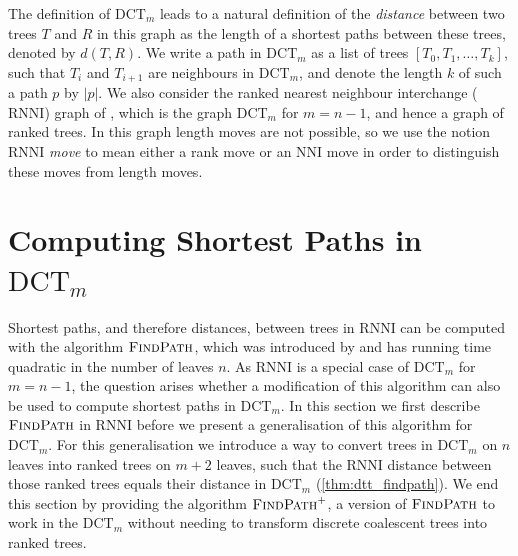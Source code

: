 \documentclass[11pt]{amsart}
\newcommand{\rnni}{\mathrm{RNNI}}
\newcommand{\findpath}{\textsc{FindPath}}
\newcommand{\nni}{\mathrm{NNI}}
\newcommand{\dct}{\mathrm{DCT}}
\newcommand{\summary}[1]{} %
\providecommand{\DIFaddtex}[1]{{\protect\color{blue}\uwave{#1}}} %
\providecommand{\DIFdeltex}[1]{{\protect\color{red}\sout{#1}}}                      %
\providecommand{\DIFaddbegin}{} %
\providecommand{\DIFaddend}{} %
\providecommand{\DIFdelbegin}{} %
\providecommand{\DIFdelend}{} %
\providecommand{\DIFadd}[1]{\texorpdfstring{\DIFaddtex{#1}}{#1}} %
\providecommand{\DIFdel}[1]{\texorpdfstring{\DIFdeltex{#1}}{}} %
\newcommand{\DIFscaledelfig}{0.5}
\newlength{\DIFdelgraphicswidth} %
\newlength{\DIFdelgraphicsheight} %
\newcommand{\DIFaddincludegraphics}[2][]{{\color{blue}\fbox{\DIFOincludegraphics[#1]{#2}}}} %
\newcommand{\DIFdelincludegraphics}[2][]{%
\sbox{\DIFdelgraphicsbox}{\DIFOincludegraphics[#1]{#2}}%
\settoboxwidth{\DIFdelgraphicswidth}{\DIFdelgraphicsbox} %
\settoboxtotalheight{\DIFdelgraphicsheight}{\DIFdelgraphicsbox} %
\scalebox{\DIFscaledelfig}{%
\parbox[b]{\DIFdelgraphicswidth}{\usebox{\DIFdelgraphicsbox}\\[-\baselineskip] \rule{\DIFdelgraphicswidth}{0em}}\llap{\resizebox{\DIFdelgraphicswidth}{\DIFdelgraphicsheight}{%
\setlength{\unitlength}{\DIFdelgraphicswidth}%
\begin{picture}(1,1)%
\thicklines\linethickness{2pt} %
{\color[rgb]{1,0,0}\put(0,0){\framebox(1,1){}}}%
{\color[rgb]{1,0,0}\put(0,0){\line( 1,1){1}}}%
{\color[rgb]{1,0,0}\put(0,1){\line(1,-1){1}}}%
\end{picture}%
}\hspace*{3pt}}} %
} %
\DeclareRobustCommand{\DIFaddbegin}{\DIFOaddbegin \let\includegraphics\DIFaddincludegraphics} %
\DeclareRobustCommand{\DIFaddend}{\DIFOaddend \let\includegraphics\DIFOincludegraphics} %
\DeclareRobustCommand{\DIFdelbegin}{\DIFOdelbegin \let\includegraphics\DIFdelincludegraphics} %
\DeclareRobustCommand{\DIFdelend}{\DIFOaddend \let\includegraphics\DIFOincludegraphics} %
\begin{document}
The definition of $\dct_m$ leads to a natural definition of the \emph{distance} between two trees $T$ and $R$ in this graph as the length of a shortest paths between these trees, denoted by \DIFdelbegin \DIFdel{$d(T,R)$}\DIFdelend \DIFaddbegin \DIFadd{$d_{\dct}(T,R)$}\DIFaddend .
We write a path in $\dct_m$ as a list of trees $[T_0, T_1, \ldots, T_k]$, such that $T_i$ and $T_{i+1}$ are neighbours in $\dct_m$, and denote the length $k$ of such a path $p$ by $|p|$.
We also consider the ranked nearest neighbour interchange ($\rnni$) graph of \textcite{Collienne2021}, which is the graph $\dct_m$ for $m=n-1$, and hence a graph of ranked trees.
In this graph length moves are not possible, so we use the notion $\rnni$ \emph{move} to mean either a rank move or an $\nni$ move in order to distinguish these moves from length moves.


\section{Computing Shortest Paths in $\dct_m$}
\label{section:fp_dtt}

\summary{Introduce how we can use $\findpath$ to compute $\dct_m$ distances}
Shortest paths, and therefore distances, between trees in $\rnni$ can be computed with the algorithm $\findpath$, which was introduced by \textcite{Collienne2021} and has running time quadratic in the number of leaves $n$.
As $\rnni$ is a special case of $\dct_m$ for $m = n-1$, the question arises whether a modification of this algorithm can also be used to compute shortest paths in $\dct_m$.
In this section we first describe $\findpath$ in $\rnni$ before we present a generalisation of this algorithm for $\dct_m$.
For this generalisation we introduce a way to convert trees in $\dct_m$ on $n$ leaves into ranked trees on $m+2$ leaves, such that the $\rnni$ distance between those ranked trees equals their distance in $\dct_m$ (\autoref{thm:dtt_findpath}).
We end this section by providing the algorithm $\findpath^+$, a version of $\findpath$ to work in the $\dct_m$ without needing to transform discrete coalescent trees into ranked trees.
\end{document}

